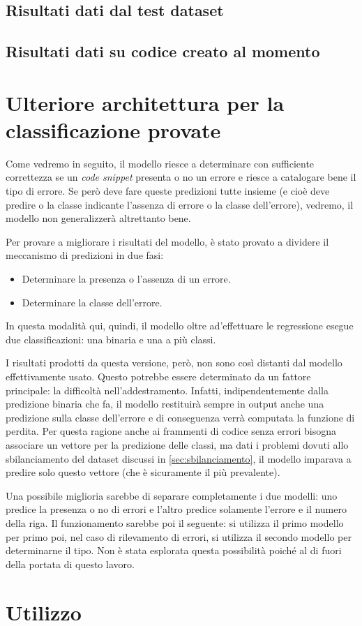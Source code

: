 \subsection{Risultati dati dal test dataset}
\subsection{Risultati dati su codice creato al momento}



\section{Ulteriore architettura per la classificazione provate}
Come vedremo in seguito, il modello riesce a determinare con sufficiente correttezza se un \textit{code snippet} presenta o no un errore e riesce a catalogare bene il tipo di errore.
Se però deve fare queste predizioni tutte insieme (e cioè deve predire o la classe indicante l'assenza di errore o la classe dell'errore), vedremo, il modello non generalizzerà altrettanto bene.

Per provare a migliorare i risultati del modello, è stato provato a dividere il meccanismo di predizioni in due fasi:
    \begin{itemize}
        \item Determinare la presenza o l'assenza di un errore.
        \item Determinare la classe dell'errore.
    \end{itemize}
In questa modalità qui, quindi, il modello oltre ad'effettuare le regressione esegue due classificazioni: una binaria e una a più classi.

I risultati prodotti da questa versione, però, non sono così distanti dal modello effettivamente usato.
Questo potrebbe essere determinato da un fattore principale: la difficoltà nell'addestramento. 
Infatti, indipendentemente dalla predizione binaria che fa, il modello restituirà sempre in output anche una predizione sulla classe dell'errore e di conseguenza verrà computata la funzione di perdita.
Per questa ragione anche ai frammenti di codice senza errori bisogna associare un vettore per la predizione delle classi, ma dati i problemi dovuti allo sbilanciamento del dataset discussi in \autoref{sec:sbilanciamento},
il modello imparava a predire solo questo vettore (che è sicuramente il più prevalente).

Una possibile miglioria sarebbe di separare completamente i due modelli: uno predice la presenza o no di errori e l'altro predice solamente l'errore e il numero della riga.
Il funzionamento sarebbe poi il seguente: si utilizza il primo modello per primo poi, nel caso di rilevamento di errori, si utilizza il secondo modello per determinarne il tipo.
Non è stata esplorata questa possibilità poiché al di fuori della portata di questo lavoro. 

\section{Utilizzo}